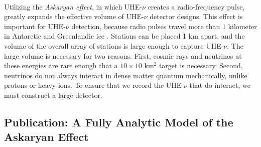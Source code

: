 \documentclass[../../../main.tex]{subfiles}
\begin{document}
\\
\vspace{0.25cm}
Utilizing the \textit{Askaryan effect}, in which UHE-$\nu$ creates a radio-frequency pulse, greatly expands the effective volume of UHE-$\nu$ detector designs.  This effect is important for UHE-$\nu$ detection, because radio pulses travel more than 1 kilometer in Antarctic and Greenlandic ice \cite{10.3189/2015jog14j214,10.3189/2015jog15j057,10.1002/2015rs005849,10.1016/j.astropartphys.2011.11.010}.  Stations can be placed 1 km apart, and the volume of the overall array of stations is large enough to capture UHE-$\nu$.  The large volume is necessary for two reasons.  First, cosmic rays and neutrinos at these energies are rare enough that a $10 \times 10$ km$^2$ target is necessary.  Second, neutrinos do not always interact in dense matter quantum mechanically, unlike protons or heavy ions.  To ensure that we record the UHE-$\nu$ that do interact, we must construct a large detector.

\subsection{Publication: A Fully Analytic Model of the Askaryan Effect}
\end{document}
